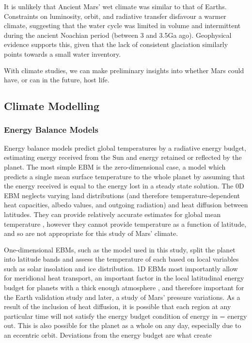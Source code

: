 \documentclass[12pt,onecolumn]{revtex4-2}    %
\begin{document}
It is unlikely that Ancient Mars' wet climate was similar to that of Earths. Constraints on luminosity, orbit, and radiative transfer disfavour a warmer climate, suggesting that the water cycle was limited in volume and intermittent during the ancient Noachian period (between 3 and 3.5Ga ago). Geophysical evidence supports this, given that the lack of consistent glaciation similarly points towards a small water inventory. %

With climate studies, we can make preliminary insights into whether Mars could have, or can in the future, host life. %

\subsection{Climate Modelling}

\subsubsection{Energy Balance Models}
Energy balance models predict global temperatures by a radiative energy budget, estimating energy received from the Sun and energy retained or reflected by the planet. The most simple EBM is the zero-dimensional case, a model which predicts a single mean surface temperature to the whole planet by assuming that the energy received is equal to the energy lost in a steady state solution. The 0D EBM neglects varying land distributions (and therefore temperature-dependent heat capacities, albedo values, and outgoing radiation) and heat diffusion between latitudes. They can provide relatively accurate estimates for global mean temperature \cite{L20}, however they cannot provide temperature as a function of latitude, and so are not appropriate for this study of Mars' climate.
\

One-dimensional EBMs, such as the model used in this study, split the planet into latitude bands and assess the temperature of each based on local variables such as solar insolation and ice distribution. 1D EBMs most importantly allow for meridional heat transport, an important factor in the local latitudinal energy budget for planets with a thick enough atmosphere \cite{SMS08}, and therefore important for the Earth validation study and later, a study of Mars' pressure variations. As a result of the inclusion of heat diffusion, it is possible that each region at any particular time will not satisfy the energy budget condition of energy in = energy out. This is also possible for the planet as a whole on any day, especially due to an eccentric orbit. Deviations from the energy budget are what create 
\end{document}
